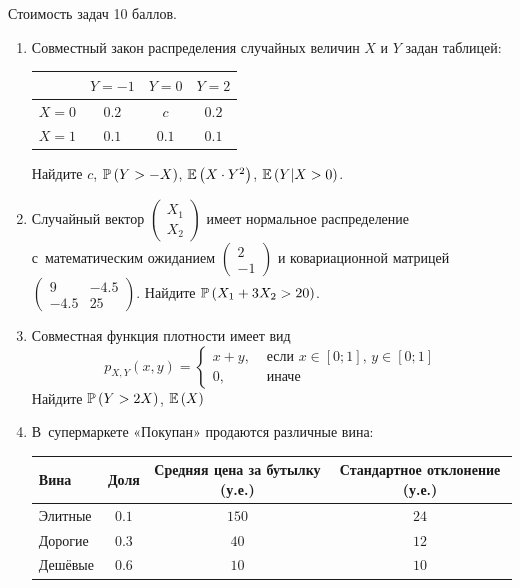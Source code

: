 Стоимость задач 10 баллов.

\begin{enumerate}
\item Совместный закон распределения случайных величин  $X$ и $Y$
задан таблицей:

\begin{center}
\begin{tabular}{@{}cccc@{}}
\toprule
    & $Y=-1$ & $Y=0$ & $Y=2$ \\ \midrule
$X=0$ & $0.2$  & $c$   & $0.2$ \\
$X=1$ & $0.1$  & $0.1$ & $0.1$ \\ \bottomrule
\end{tabular}
\end{center}

Найдите $c$, $\P\left(Y>-X\right)$, $\E\left(X\cdot Y^{2} \right)$,
$\E\left(Y|X>0\right)$.

\item Случайный вектор  $\left(\begin{array}{c}
{X_{1} } \\ {X_{2} }
\end{array}\right)$  имеет нормальное распределение с~математическим ожиданием
$\left(\begin{array}{c} {2} \\ {-1}
\end{array}\right)$  и ковариационной матрицей
$\left(\begin{array}{cc} {9} & {-4.5} \\ {-4.5} & {25}
\end{array}\right)$. Найдите  $\P\left(X_{1} +3X_{2} >20\right)$.

\item Совместная функция плотности имеет вид
\[
p_{X,Y} \left(x,y\right)=
\begin{cases}
x+y, & \text{ если } x\in \left[0;1\right],\, y\in \left[0;1\right] \\
0, & \text{ иначе}
\end{cases}
\]
Найдите  $\P\left(Y>2X\right)$,  $\E\left(X\right)$

\item В~супермаркете «Покупан» продаются различные вина:

\begin{center}
\begin{tabular}{@{}lccc@{}}
\toprule
Вина    & Доля & Средняя цена за бутылку (у.е.) & Стандартное отклонение (у.е.) \\ \midrule
Элитные & $0.1$  & $150$                           & $24$                           \\
Дорогие & $0.3$  & $40$                             & $12$                            \\
Дешёвые & $0.6$  & $10$                             & $10$                            \\ \bottomrule
\end{tabular}
\end{center}


\end{enumerate}
